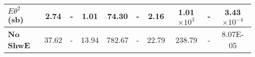 \begin{table}[!hb]
\begin{tabular}{|l|ccc|ccc|ccc|}
\textbf{$E\theta^2$ (sb)}  & 2.74              & -                                                              & 1.01                                      & 74.30              & -                                                               & 2.16                                       & 1.01$\times 10^3$          & - & 3.43$\times 10^{-4}$                                  \\\hline\hline
\textbf{No ShwE}  & 37.62             & -                                                           & 13.94                                     & 782.67             & -                                                            & 22.79                                      & 238.79            & -                                                              & 8.07E-05   \\\hline
\end{tabular}
\label{tab:CutflowTableSignal}
\end{table}

